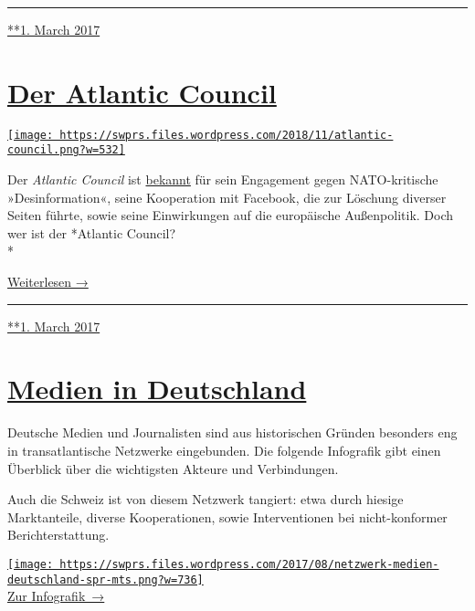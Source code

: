 \begin{center}\rule{0.5\linewidth}{\linethickness}\end{center}

\href{https://swprs.org/2017/03/01/netzwerk-medien-usa/}{**1. March
2017}

\hypertarget{der-atlantic-council}{%
\section{\texorpdfstring{\href{https://swprs.org/2017/03/01/der-atlantic-council/}{Der
Atlantic Council}}{Der Atlantic Council}}\label{der-atlantic-council}}

\href{https://swprs.org/2017/03/01/der-atlantic-council/}{\texttt{[image: https://swprs.files.wordpress.com/2018/11/atlantic-council.png?w=532]}}

Der \emph{Atlantic Council} ist
\href{https://www.rubikon.news/artikel/facebook-als-waffe}{bekannt} für
sein En­ga­ge­ment gegen NATO-kritische »Des­in­for­ma­tion«, seine
Kooperation mit Facebook, die zur Lö­schung diverser Seiten führte,
sowie seine Ein­wir­kungen auf die eu­ro­pä­ische Außen­politik. Doch
wer ist der *Atlantic Council?\\
*

\href{https://swprs.org/atlantic-council/}{Weiterlesen →}

\begin{center}\rule{0.5\linewidth}{\linethickness}\end{center}

\href{https://swprs.org/2017/03/01/der-atlantic-council/}{**1. March
2017}

\hypertarget{medien-in-deutschland}{%
\section{\texorpdfstring{\href{https://swprs.org/2017/03/01/medien-in-deutschland/}{Medien
in Deutschland}}{Medien in Deutschland}}\label{medien-in-deutschland}}

Deutsche Medien und Journalisten sind aus historischen Gründen besonders
eng in trans­at­lan­tische Netz­werke eingebunden. Die folgende
Info­grafik gibt einen Über­blick über die wich­tigsten Akteure und
Ver­bindungen.

Auch die Schweiz ist von diesem Netzwerk tangiert: etwa durch hiesige
Marktanteile, diverse Kooperationen, sowie Interventionen bei
nicht-konformer Berichterstattung.

\href{https://swprs.org/netzwerk-medien-deutschland/}{\texttt{[image: https://swprs.files.wordpress.com/2017/08/netzwerk-medien-deutschland-spr-mts.png?w=736]}\\
Zur Infografik~→}

